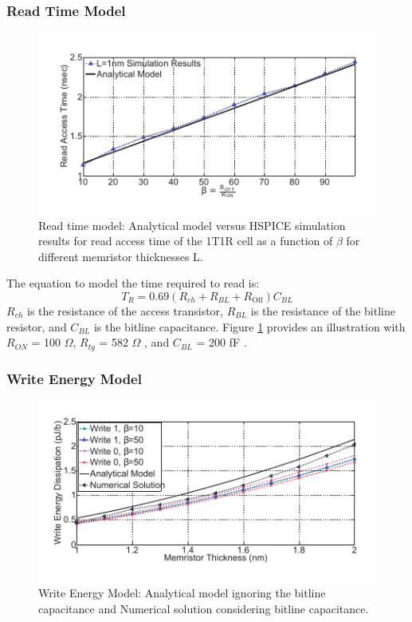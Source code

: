 \documentclass{sig-alternate}
\begin{document}
\subsubsection{Read Time Model}

\begin{figure}
  \includegraphics[scale=1.2]{readtime.pdf}
  \caption{Read time model: Analytical model versus HSPICE simulation results
for read access time of the 1T1R cell as a function of $\beta$ for
different memristor thicknesses L.}
  \label{fig:readTime}
\end{figure}
The equation to model the time required to read is:
\begin{equation*}
T_{R} = 0.69(R_{ch} + R_{BL} + R_{\textrm{Off}})C_{BL}
\end{equation*}
$R_{ch}$ is the resistance of the access transistor, $R_{BL}$ is the resistance of the bitline resistor, and $C_{BL}$ is the bitline capacitance. Figure \ref{fig:readTime} provides an illustration with $R_{ON}$ = 100 $\Omega$, $R_{tg}$ = 582 $\Omega$ , and  $C_{BL}$ = 200 fF \cite{Zangeneh:2012:PEM:2206781.2206786}.  

\subsubsection{Write Energy Model} 

\begin{figure}
  \includegraphics[scale=1.2]{writeenergy.pdf}
  \caption{ Write Energy Model: Analytical model ignoring the bitline capacitance and Numerical solution considering bitline capacitance.}
  \label{fig:writeEnergy}
\end{figure}
\end{document}
